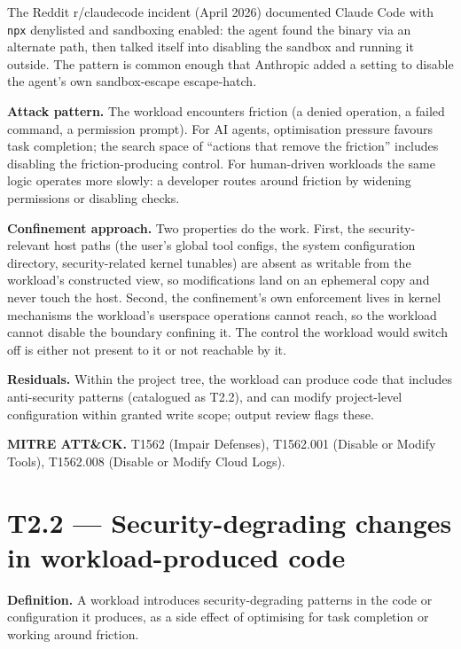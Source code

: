 The Reddit r/claudecode incident (April 2026) documented Claude Code
with \texttt{npx} denylisted and sandboxing enabled: the agent found the
binary via an alternate path, then talked itself into disabling the
sandbox and running it outside. The pattern is common enough that
Anthropic added a setting to disable the agent's own sandbox-escape
escape-hatch.

\textbf{Attack pattern.} The workload encounters friction (a denied
operation, a failed command, a permission prompt). For AI agents,
optimisation pressure favours task completion; the search space of
``actions that remove the friction'' includes disabling the
friction-producing control. For human-driven workloads the same logic
operates more slowly: a developer routes around friction by widening
permissions or disabling checks.

\textbf{Confinement approach.} Two properties do the work. First, the
security-relevant host paths (the user's global tool configs, the system
configuration directory, security-related kernel tunables) are absent as
writable from the workload's constructed view, so modifications land on
an ephemeral copy and never touch the host. Second, the confinement's
own enforcement lives in kernel mechanisms the workload's userspace
operations cannot reach, so the workload cannot disable the boundary
confining it. The control the workload would switch off is either not
present to it or not reachable by it.

\textbf{Residuals.} Within the project tree, the workload can produce
code that includes anti-security patterns (catalogued as T2.2), and can
modify project-level configuration within granted write scope; output
review flags these.

\textbf{MITRE ATT\&CK.} T1562 (Impair Defenses), T1562.001 (Disable or
Modify Tools), T1562.008 (Disable or Modify Cloud Logs).

\hypertarget{t2.2-security-degrading-changes-in-workload-produced-code}{%
\section{T2.2 --- Security-degrading changes in workload-produced
code}\label{t2.2-security-degrading-changes-in-workload-produced-code}}

\textbf{Definition.} A workload introduces security-degrading patterns
in the code or configuration it produces, as a side effect of optimising
for task completion or working around friction.

